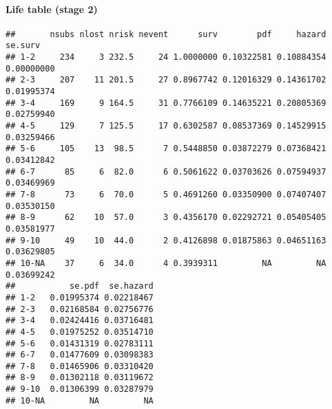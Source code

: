 \documentclass[]{article}
\newenvironment{Shaded}{\begin{snugshade}}{\end{snugshade}}
\newcommand{\KeywordTok}[1]{\textcolor[rgb]{0.13,0.29,0.53}{\textbf{#1}}}
\newcommand{\DecValTok}[1]{\textcolor[rgb]{0.00,0.00,0.81}{#1}}
\newcommand{\StringTok}[1]{\textcolor[rgb]{0.31,0.60,0.02}{#1}}
\newcommand{\OtherTok}[1]{\textcolor[rgb]{0.56,0.35,0.01}{#1}}
\newcommand{\OperatorTok}[1]{\textcolor[rgb]{0.81,0.36,0.00}{\textbf{#1}}}
\newcommand{\NormalTok}[1]{#1}
\let\oldparagraph\paragraph
\renewcommand{\paragraph}[1]{\oldparagraph{#1}\mbox{}}
\begin{document}
\paragraph{Life table (stage 2)}\label{life-table-stage-2}

\begin{Shaded}
\end{Shaded}

\begin{verbatim}
##       nsubs nlost nrisk nevent      surv        pdf     hazard    se.surv
## 1-2     234     3 232.5     24 1.0000000 0.10322581 0.10884354 0.00000000
## 2-3     207    11 201.5     27 0.8967742 0.12016329 0.14361702 0.01995374
## 3-4     169     9 164.5     31 0.7766109 0.14635221 0.20805369 0.02759940
## 4-5     129     7 125.5     17 0.6302587 0.08537369 0.14529915 0.03259466
## 5-6     105    13  98.5      7 0.5448850 0.03872279 0.07368421 0.03412842
## 6-7      85     6  82.0      6 0.5061622 0.03703626 0.07594937 0.03469969
## 7-8      73     6  70.0      5 0.4691260 0.03350900 0.07407407 0.03530150
## 8-9      62    10  57.0      3 0.4356170 0.02292721 0.05405405 0.03581977
## 9-10     49    10  44.0      2 0.4126898 0.01875863 0.04651163 0.03629805
## 10-NA    37     6  34.0      4 0.3939311         NA         NA 0.03699242
##           se.pdf  se.hazard
## 1-2   0.01995374 0.02218467
## 2-3   0.02168584 0.02756776
## 3-4   0.02424416 0.03716481
## 4-5   0.01975252 0.03514710
## 5-6   0.01431319 0.02783111
## 6-7   0.01477609 0.03098383
## 7-8   0.01465906 0.03310420
## 8-9   0.01302118 0.03119672
## 9-10  0.01306399 0.03287979
## 10-NA         NA         NA
\end{verbatim}
\end{document}
